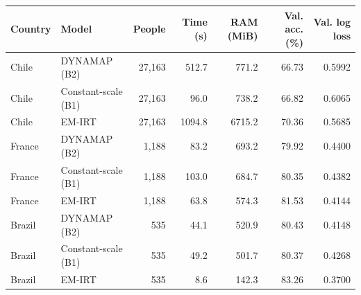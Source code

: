 \begin{tabular}{llrrrrr}
\toprule
Country & Model & People & Time (s) & RAM (MiB) & Val. acc. (\%) & Val. log loss \\
\midrule
Chile & DYNAMAP (B2) & 27,163 & 512.7 & 771.2 & 66.73 & 0.5992 \\
Chile & Constant-scale (B1) & 27,163 & 96.0 & 738.2 & 66.82 & 0.6065 \\
Chile & EM-IRT & 27,163 & 1094.8 & 6715.2 & 70.36 & 0.5685 \\
France & DYNAMAP (B2) & 1,188 & 83.2 & 693.2 & 79.92 & 0.4400 \\
France & Constant-scale (B1) & 1,188 & 103.0 & 684.7 & 80.35 & 0.4382 \\
France & EM-IRT & 1,188 & 63.8 & 574.3 & 81.53 & 0.4144 \\
Brazil & DYNAMAP (B2) & 535 & 44.1 & 520.9 & 80.43 & 0.4148 \\
Brazil & Constant-scale (B1) & 535 & 49.2 & 501.7 & 80.37 & 0.4268 \\
Brazil & EM-IRT & 535 & 8.6 & 142.3 & 83.26 & 0.3700 \\
\bottomrule
\end{tabular}
